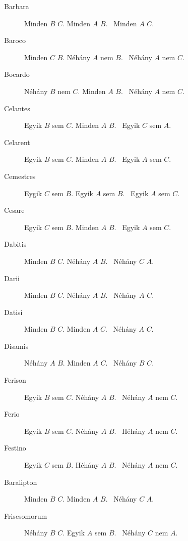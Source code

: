 \begin{description}
\item[Barbara] Minden $B$ $C$. Minden $A$ $B$.
	\therefore\  Minden $A$ $C$.
\item[Baroco] Minden $C$ $B$. Néhány $A$ nem $B$.
	\therefore\  Néhány $A$ nem $C$.
\item[Bocardo] Néhány $B$ nem $C$. Minden $A$ $B$.
	\therefore\  Néhány $A$ nem $C$.
\item[Celantes] Egyik $B$ sem $C$. Minden $A$ $B$.
	\therefore\  Egyik $C$ sem $A$.
\item[Celarent] Egyik $B$ sem $C$. Minden $A$ $B$.
	\therefore\  Egyik $A$ sem $C$.
\item[Cemestres] Eygik $C$ sem $B$. Egyik $A$ sem $B$.
	\therefore\  Egyik $A$ sem $C$.
\item[Cesare] Egyik $C$ sem $B$. Minden $A$ $B$.
	\therefore\  Egyik $A$ sem $C$.
\item[Dabitis] Minden $B$ $C$. Néhány $A$ $B$.
	\therefore\  Néhány $C$ $A$.
\item[Darii] Minden $B$ $C$. Néhány $A$ $B$.
	\therefore\  Néhány $A$ $C$.
\item[Datisi] Minden $B$ $C$. Minden $A$ $C$.
	\therefore\  Néhány $A$ $C$.
\item[Disamis] Néhány $A$ $B$. Minden $A$ $C$.
	\therefore\  Néhány $B$ $C$.
\item[Ferison] Egyik $B$ sem $C$. Néhány $A$ $B$.
	\therefore\  Néhány $A$ nem $C$.
\item[Ferio] Egyik $B$ sem $C$. Néhány $A$ $B$.
	\therefore\  Héhány $A$ nem $C$.
\item[Festino] Egyik $C$ sem $B$. Héhány $A$ $B$.
	\therefore\  Néhány $A$ nem $C$.
\item[Baralipton] Minden $B$ $C$. Minden $A$ $B$.
	\therefore\  Néhány $C$ $A$.
\item[Frisesomorum] Néhány $B$ $C$. Egyik $A$ sem $B$.
	\therefore\  Néhány $C$ nem $A$.
\end{description}


